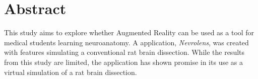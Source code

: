 \section*{Abstract}


This study aims to explore whether Augmented Reality can be used as a tool for medical students learning neuroanatomy. A application, \textit{Nevrolens}, was created with features simulating a conventional rat brain dissection. While the results from this study are limited, the application has shown promise in its use as a virtual simulation of a rat brain dissection.